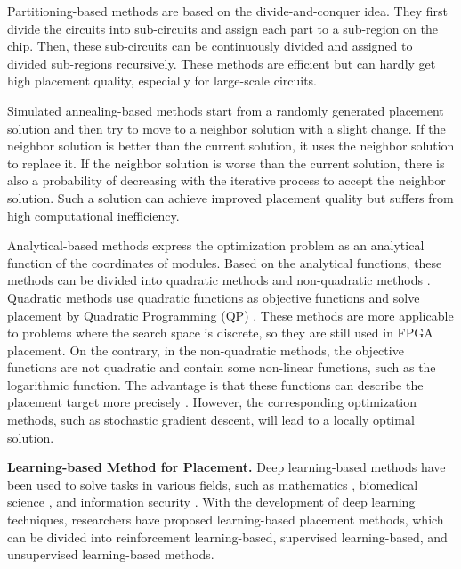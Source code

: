 \documentclass{article}
\theoremstyle{plain}
\theoremstyle{definition}
\theoremstyle{remark}
\begin{document}
Partitioning-based methods \cite{roy2006min, khatkhate2004recursive} are based on the divide-and-conquer idea. They first divide the circuits into sub-circuits and assign each part to a sub-region on the chip. Then, these sub-circuits can be continuously divided and assigned to divided sub-regions recursively. These methods are efficient but can hardly get high placement quality, especially for large-scale circuits.

Simulated annealing-based methods \cite{yang2000dragon2000, vashisht2020placement} start from a randomly generated placement solution and then try to move to a neighbor solution with a slight change. If the neighbor solution is better than the current solution, it uses the neighbor solution to replace it. If the neighbor solution is worse than the current solution, there is also a probability of decreasing with the iterative process to accept the neighbor solution. Such a solution can achieve improved placement quality but suffers from high computational inefficiency.

Analytical-based methods express the optimization problem as an analytical function of the coordinates of modules. Based on the analytical functions, these methods can be divided into quadratic methods \cite{viswanathan2007rql, viswanathan2007fastplace, kim2012maple, kim2012complx, brenner2015bonnplace, lin2013polar, spindler2008kraftwerk2} and non-quadratic methods \cite{chen2008ntuplace3, lu2014eplace, cheng2018replace, lin2020dreamplace, chan2006mpl6, kahng2005aplace,  gu2020dreamplace}. Quadratic methods use quadratic functions as objective functions and solve placement by Quadratic Programming (QP) \cite{nocedal2006quadratic}. These methods are more applicable to problems where the search space is discrete, so they are still used in FPGA placement. On the contrary, in the non-quadratic methods, the objective functions are not quadratic and contain some non-linear functions, such as the logarithmic function. The advantage is that these functions can describe the placement target more precisely \cite{cheng2018replace, lu2014eplace}. However, the corresponding optimization methods, such as stochastic gradient descent, will lead to a locally optimal solution. 

\textbf{Learning-based Method for Placement.} 
Deep learning-based methods have been used to solve tasks in various fields, such as mathematics \cite{davies2021advancing}, biomedical science \cite{jumper2021highly}, and information security \cite{lai2020opensmax}.
With the development of deep learning techniques, researchers have proposed learning-based placement methods, which can be divided into reinforcement learning-based, supervised learning-based, and unsupervised learning-based methods.
\end{document}
